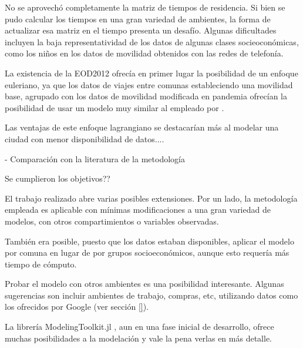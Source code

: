 No se aprovechó completamente la matriz de tiempos de residencia. Si bien se pudo calcular los tiempos en una gran variedad de ambientes, la forma de actualizar esa matriz en el tiempo presenta un desafío. Algunas dificultades incluyen la baja representatividad de los datos de algunas clases socieoconómicas, como los niños en los datos de movilidad obtenidos con las redes de telefonía. 

La existencia de la EOD2012 ofrecía en primer lugar la posibilidad de un enfoque euleriano, ya que los datos de viajes entre comunas estableciendo una movilidad base, agrupado con los datos de movilidad modificada en pandemia ofrecían la posibilidad de usar un modelo muy similar al empleado por \cite{Lai2020}.


Las ventajas de este enfoque lagrangiano se destacarían más al modelar una ciudad con menor disponibilidad de datos....


- Comparación con la literatura de la metodología 


Se cumplieron los objetivos??



El trabajo realizado abre varias posibles extensiones. Por un lado, la metodología empleada es aplicable con mínimas modificaciones a una gran variedad de modelos, con otros compartimientos o variables observadas.

También era posible, puesto que los datos estaban disponibles, aplicar el modelo por comuna en lugar de por grupos socioeconómicos, aunque esto requería más tiempo de cómputo. 

Probar el modelo con otros ambientes es una posibilidad interesante. Algunas sugerencias son incluir ambientes de trabajo, compras, etc, utilizando datos como los ofrecidos por Google (ver sección \ref{}).

La librería ModelingToolkit.jl \cite{}, aun en una fase inicial de desarrollo, ofrece muchas posibilidades a la modelación y vale la pena verlas en más detalle.